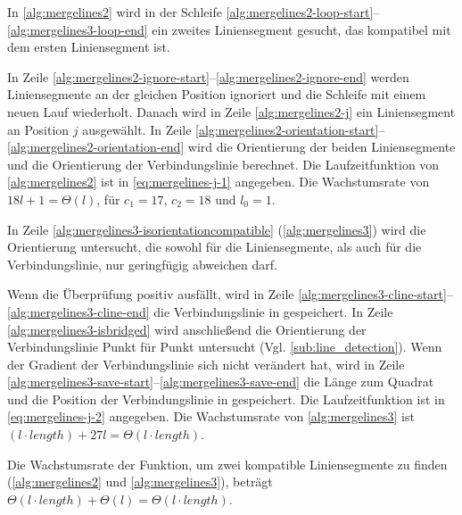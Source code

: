 In \autoref{alg:mergelines2} wird in der Schleife \ref{alg:mergelines2-loop-start}--\ref{alg:mergelines3-loop-end} ein
 zweites Liniensegment gesucht, das kompatibel mit dem ersten Liniensegment ist.

In Zeile \ref{alg:mergelines2-ignore-start}--\ref{alg:mergelines2-ignore-end} werden Liniensegmente an der gleichen
 Position ignoriert und die Schleife mit einem neuen Lauf wiederholt. Danach wird in Zeile \ref{alg:mergelines2-j} ein
 Liniensegment an Position $j$ ausgewählt. In Zeile
 \ref{alg:mergelines2-orientation-start}--\ref{alg:mergelines2-orientation-end} wird die Orientierung der beiden
 Liniensegmente und die Orientierung der Verbindungslinie berechnet. Die Laufzeitfunktion von \autoref{alg:mergelines2}
 ist in \autoref{eq:mergelines-j-1} angegeben. Die Wachstumsrate von $18l + 1 = \Theta(l)$, für $c_{1} = 17$,
 $c_{2} = 18$ und $l_{0} = 1$.

In Zeile \ref{alg:mergelines3-isorientationcompatible} (\autoref{alg:mergelines3}) wird die Orientierung untersucht,
 die sowohl für die Liniensegmente, als auch für die Verbindungslinie, nur geringfügig abweichen darf.

Wenn die Überprüfung positiv ausfällt, wird in Zeile \ref{alg:mergelines3-cline-start}--\ref{alg:mergelines3-cline-end}
 die Verbindungslinie in  gespeichert. In Zeile \ref{alg:mergelines3-isbridged} wird anschließend die
 Orientierung der Verbindungslinie Punkt für Punkt untersucht (Vgl. \autoref{sub:line_detection}). Wenn der Gradient
 der Verbindungslinie sich nicht verändert hat, wird in Zeile
 \ref{alg:mergelines3-save-start}--\ref{alg:mergelines3-save-end} die Länge zum Quadrat und die Position der
 Verbindungslinie in  gespeichert. Die Laufzeitfunktion ist in \autoref{eq:mergelines-j-2}
 angegeben. Die Wachstumsrate von \autoref{alg:mergelines3} ist
 $(l \cdot \mathit{length}) + 27l = \Theta(l \cdot \mathit{length})$.

Die Wachstumsrate der Funktion, um zwei kompatible Liniensegmente zu finden (\autoref{alg:mergelines2} und
 \autoref{alg:mergelines3}), beträgt $\Theta(l \cdot \mathit{length}) + \Theta(l) = \Theta(l \cdot \mathit{length})$.

